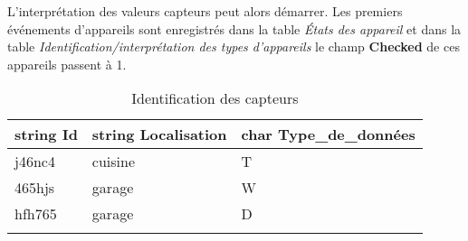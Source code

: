 \documentclass[10pt,a4paper]{article}
\begin{document}
\begin{table}[h!]
\caption{Identification/interprétation des types d'appareils}
\end{table}

\newpage
L'interprétation des valeurs capteurs peut alors démarrer. Les premiers événements d'appareils sont enregistrés dans la table \textit{États des appareil} et dans la table \textit{Identification/interprétation des types d'appareils} le champ \textbf{Checked} de ces appareils passent à 1. \\

\begin{table}[h!]
    \centering
    \begin{tabular}{|l|l|l|}
    \hline
    \rowcolor[HTML]{EFEFEF} 
    string Id & string Localisation & char Type\_de\_données \\ \hline
    j46nc4    & cuisine             & T                      \\ \hline
    465hjs    & garage              & W                      \\ \hline
    hfh765    & garage              & D                      \\ \hline
              &                     &                       
    \end{tabular}
    \caption{Identification des capteurs}
\end{table}
\end{document}
